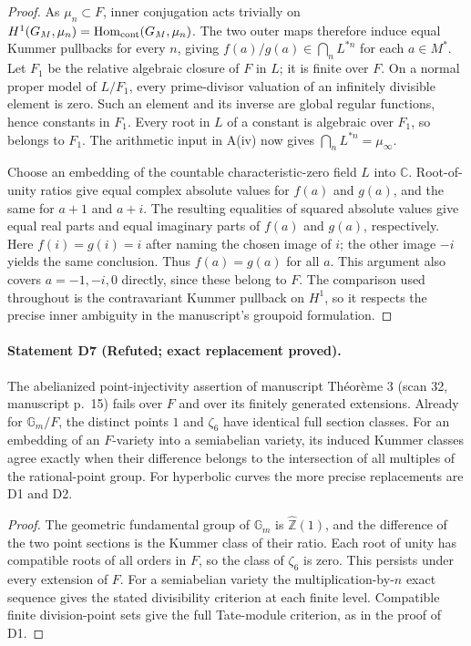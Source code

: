 \begin{proof}
As $\mu_n\subset F$, inner conjugation acts trivially on
$H^1(G_M,\mu_n)=\operatorname{Hom}_{\rm cont}(G_M,\mu_n)$.
The two outer maps therefore induce equal Kummer pullbacks for every
$n$, giving $f(a)/g(a)\in\bigcap_n L^{*n}$ for each $a\in M^*$.
Let $F_1$ be the relative algebraic closure of $F$ in $L$; it is finite
over $F$.  On a normal proper model of $L/F_1$, every prime-divisor
valuation of an infinitely divisible element is zero.  Such an element
and its inverse are global regular functions, hence constants in $F_1$.
Every root in $L$ of a constant is algebraic over $F_1$, so belongs to
$F_1$.  The arithmetic input in A(iv) now gives
$\bigcap_nL^{*n}=\mu_\infty$.

Choose an embedding of the countable characteristic-zero field $L$ into
$\mathbb C$.  Root-of-unity ratios give equal complex absolute values
for $f(a)$ and $g(a)$, and the same for $a+1$ and $a+i$.
The resulting equalities of squared absolute values give equal real
parts and equal imaginary parts of $f(a)$ and $g(a)$, respectively.
Here $f(i)=g(i)=i$ after naming the chosen image of $i$; the other image
$-i$ yields the same conclusion.  Thus $f(a)=g(a)$ for all $a$.
This argument also covers $a=-1,-i,0$ directly, since these belong to
$F$.  The comparison used throughout is the contravariant Kummer
pullback on $H^1$, so it respects the precise inner ambiguity in the
manuscript's groupoid formulation.
\end{proof}

\paragraph{Statement D7 (Refuted; exact replacement proved).}\label{res:D7}
The abelianized point-injectivity assertion of manuscript Th\'eor\`eme 3
(scan 32, manuscript p.~15) fails over $F$ and over its finitely generated
extensions.  Already for $\mathbb G_m/F$, the distinct points $1$ and
$\zeta_6$ have identical full section classes.  For an embedding of an
$F$-variety into a semiabelian variety, its induced Kummer classes agree
exactly when their difference belongs to the intersection of all
multiples of the rational-point group.  For hyperbolic curves the more
precise replacements are D1 and D2.

\begin{proof}
The geometric fundamental group of $\mathbb G_m$ is
$\widehat{\mathbb Z}(1)$, and the difference of the two point sections
is the Kummer class of their ratio.  Each root of unity has compatible
roots of all orders in $F$, so the class of $\zeta_6$ is zero.  This
persists under every extension of $F$.  For a semiabelian variety the
multiplication-by-$n$ exact sequence gives the stated divisibility
criterion at each finite level.  Compatible finite division-point sets
give the full Tate-module criterion, as in the proof of D1.
\end{proof}

